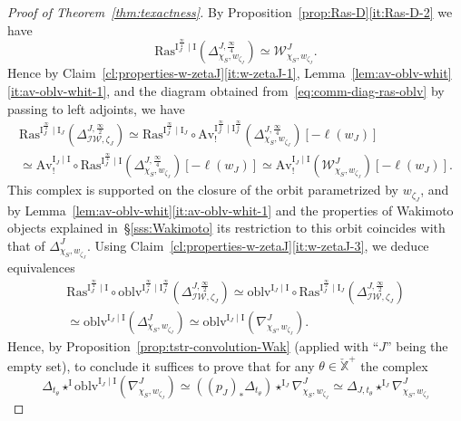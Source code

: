 \documentclass[11pt]{amsart}
\numberwithin{equation}{section}
\theoremstyle{plain}
\theoremstyle{definition}
\newcommand{\I}{{\mathrm I}}
\newcommand{\sL}{{\mathcal L}}
\newcommand{\sW}{{\mathcal W}}
\newcommand{\X}{{\mathbb X}}
\newcommand{\Xd}{\check{\X}}
\newcommand{\semi}{{{\frac{\infty}{2}}}}
\newcommand{\quar}{{{\frac{\infty}{4}}}}
\newcommand{\oblv}{\mathrm{oblv}}
\newcommand{\Av}{\mathrm{Av}}
\newcommand{\IW}{\mathcal{IW}}
\newcommand{\Shv}{\mathsf{Shv}}
\begin{document}
\begin{proof}[Proof of Theorem~\ref{thm:texactness}]
By Proposition~\ref{prop:Ras-D}\eqref{it:Ras-D-2} we have 
\[
\mathrm{Ras}^{\I_J^{\quar}\mid \I} \left( \Delta^{J,\quar}_{\chi_S,w_{\zeta_J}} \right)
\simeq \sW^{J}_{\chi_S,w_{\zeta_J}}.
\]
Hence by Claim~\ref{cl:properties-w-zetaJ}\eqref{it:w-zetaJ-1}, Lemma~\ref{lem:av-oblv-whit}\eqref{it:av-oblv-whit-1}, and the diagram obtained from~\eqref{eq:comm-diag-ras-oblv} by passing to left adjoints,
we have 
\begin{multline*}
\mathrm{Ras}^{\I_J^{\semi}\mid \I_J} \left( \Delta^{J,\semi}_{\IW,\zeta_J} \right) \simeq
\mathrm{Ras}^{\I_J^{\semi}\mid \I_J} \circ \Av^{\I^\semi_J \mid \I^\quar_J}_! \left (\Delta^{J,\quar}_{\chi_S,w_{\zeta_J}} \right) [-\ell(w_J)] \\
\simeq \Av^{\I_J \mid \I}_! \circ \mathrm{Ras}^{\I_J^{\quar}\mid \I} \left (\Delta^{J,\quar}_{\chi_S,w_{\zeta_J}} \right) [-\ell(w_J)]
\simeq \Av^{\I_J \mid \I}_! \left( \sW^{J}_{\chi_S,w_{\zeta_J}} \right) [-\ell(w_J)].
\end{multline*}
This complex is supported on the closure of the orbit parametrized by $w_{\zeta_J}$, and by Lemma~\ref{lem:av-oblv-whit}\eqref{it:av-oblv-whit-1} and the properties of Wakimoto objects explained in~\S\ref{sss:Wakimoto} its restriction to this orbit coincides with that of $\Delta^J_{\chi_S,w_{\zeta_J}}$.
Using Claim~\ref{cl:properties-w-zetaJ}\eqref{it:w-zetaJ-3}, we deduce equivalences
\begin{multline*}
\mathrm{Ras}^{\I_J^{\quar}\mid \I} \circ \oblv^{\I_J^{\semi} \mid \I_J^\quar} \left( \Delta^{J,\semi}_{\IW,\zeta_J} \right) \simeq
\oblv^{\I_J\mid \I} \circ \mathrm{Ras}^{\I_J^{\semi}\mid \I_J} \left( \Delta^{J,\semi}_{\IW,\zeta_J} \right) \\
\simeq \oblv^{\I_J\mid \I} (\Delta^J_{\chi_S,w_{\zeta_J}}) \simeq \oblv^{\I_J\mid \I} (\nabla^J_{\chi_S,w_{\zeta_J}}).
\end{multline*}
Hence, by Proposition~\ref{prop:tstr-convolution-Wak} (applied with ``$J$'' being the empty set), to conclude it suffices to prove that for any $\theta\in \Xd^+$ the complex
\[
\Delta_{t_\theta}\star^{\I}\oblv^{\I_J\mid \I}(\nabla^J_{\chi_S,w_{\zeta_J}})
\simeq ((p_J)_* \Delta_{t_\theta}) \star^{\I_J} \nabla^J_{\chi_S,w_{\zeta_J}}
\simeq \Delta_{J,t_\theta} \star^{\I_J} \nabla^J_{\chi_S,w_{\zeta_J}}
\]
\end{proof}
\end{document}
